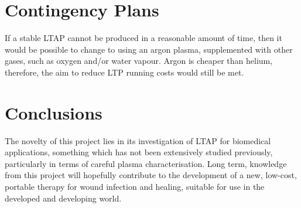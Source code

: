 \documentclass[11pt, oneside]{article}   	%
\begin{document}
\section*{Contingency Plans}
If a stable LTAP cannot be produced in a reasonable amount of time, then it would be possible to change to using an argon plasma, supplemented with other gases, such as oxygen and/or water vapour.
Argon is cheaper than helium, therefore, the aim to reduce LTP running costs would still be met.


\section*{Conclusions}
The novelty of this project lies in its investigation of LTAP for biomedical applications, something which has not been extensively studied previously, particularly in terms of careful plasma characterisation.
Long term, knowledge from this project will hopefully contribute to the development of a new, low-cost, portable therapy for wound infection and healing, suitable for use in the developed and developing world.







%

\end{document}

